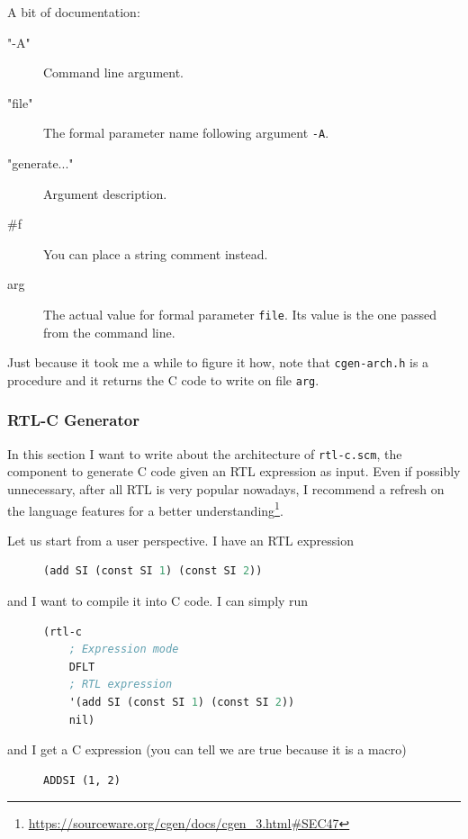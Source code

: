 \documentclass{article}
\begin{document}
A bit of documentation:
\begin{description}
\item["-A"] Command line argument.
\item["file"] The formal parameter name following argument \texttt{-A}.
\item["generate..."] Argument description.
\item[\#f] You can place a string comment instead.
\item[arg] The actual value for formal parameter \texttt{file}. Its value is the one passed from the command line.
\end{description}

Just because it took me a while to figure it how, note that \texttt{cgen-arch.h} is a procedure and it returns the C code to write on file \texttt{arg}.

\subsubsection{RTL-C Generator} \label{sec:rtl-c}
In this section I want to write about the architecture of \texttt{rtl-c.scm}, the component to generate C code given an RTL expression as input. Even if possibly unnecessary, after all RTL is very popular nowadays, I recommend a refresh on the language features for a better understanding\footnote{\url{https://sourceware.org/cgen/docs/cgen_3.html\#SEC47}}.

Let us start from a user perspective. I have an RTL expression

\begin{figure}[H]
\begin{lstlisting}[language=Scheme]
(add SI (const SI 1) (const SI 2))
\end{lstlisting}
\end{figure}

and I want to compile it into C code. I can simply run 

\begin{figure}[H]
\begin{lstlisting}[language=Scheme]
(rtl-c
	; Expression mode
	DFLT
	; RTL expression
	'(add SI (const SI 1) (const SI 2))
	nil)
\end{lstlisting}
\end{figure}

and I get a C expression (you can tell we are true because it is a macro)

\begin{figure}[H]
\begin{lstlisting}
ADDSI (1, 2)
\end{lstlisting}
\end{figure}
\end{document}
